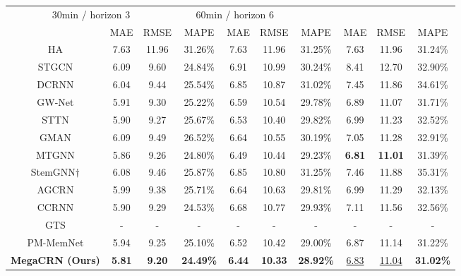 \documentclass[letterpaper]{article} \usepackage{aaai23}  \usepackage{times}  \usepackage{helvet}  \usepackage{courier}  \usepackage[hyphens]{url}  \usepackage{graphicx} \urlstyle{rm} \def\UrlFont{\rm}  \usepackage{natbib}  \usepackage{caption} \usepackage{multirow}
\begin{document}
\begin{table*}[h]
{\begin{tabular*}{17.6cm}{@{\extracolsep{\fill}}cccccccccc}
		\multicolumn{3}{c}{30min / horizon 3} &
		\multicolumn{3}{c}{60min / horizon 6} \\
		\cline{2-4} \cline{5-7} \cline{8-10}
		\multicolumn{1}{l}{} & 
		\multicolumn{1}{c}{MAE} & 
		\multicolumn{1}{c}{RMSE} &
		\multicolumn{1}{c}{MAPE} &
		\multicolumn{1}{c}{MAE} & 
		\multicolumn{1}{c}{RMSE} &
		\multicolumn{1}{c}{MAPE} &
		\multicolumn{1}{c}{MAE} & 
		\multicolumn{1}{c}{RMSE} &
		\multicolumn{1}{c}{MAPE} \\
		\hline
		HA\cite{li2018diffusion} & 7.63 & 11.96 & 31.26\% & 7.63 & 11.96 & 31.25\% & 7.63 & 11.96 & 31.24\% \\
		STGCN\cite{yu2018spatio} & 6.09 & 9.60 & 24.84\% & 6.91 & 10.99 & 30.24\% & 8.41 & 12.70 & 32.90\%\\
		DCRNN\cite{li2018diffusion} & 6.04 & 9.44 & 25.54\% & 6.85 & 10.87 & 31.02\% & 7.45 & 11.86 & 34.61\%\\
		GW-Net\cite{wu2019graph} & 5.91 & 9.30 & 25.22\% & 6.59 & 10.54 & 29.78\% & 6.89 & 11.07 & 31.71\% \\
		STTN\cite{xu2020spatial} & 5.90 & 9.27 & 25.67\% & 6.53 & 10.40 & 29.82\% & 6.99 & 11.23 & 32.52\%\\
		GMAN\cite{zheng2020gman} & 6.09 & 9.49 & 26.52\% & 6.64 & 10.55 & 30.19\% & 7.05 & 11.28 & 32.91\%\\
		MTGNN\cite{wu2020connecting} & 5.86 & 9.26 & 24.80\% & 6.49 & 10.44 & 29.23\% & \textbf{6.81} & \textbf{11.01} & 31.39\% \\
		StemGNN\cite{cao2020spectral}$\dagger$ & 6.08 & 9.46 & 25.87\% & 6.85 & 10.80 & 31.25\% & 7.46 & 11.88 & 35.31\%\\
		AGCRN\cite{bai2020adaptive} & 5.99 & 9.38 & 25.71\% & 6.64 & 10.63 & 29.81\% & 6.99 & 11.29 & 32.13\% \\
		CCRNN\cite{ye2021coupled} & 5.90 & 9.29 & 24.53\% & 6.68 & 10.77 & 29.93\% & 7.11 & 11.56 & 32.56\%\\
GTS\cite{shang2021discrete} & - & - & - & - & - & - & - & - & - \\
		PM-MemNet\cite{lee2021learning} & 5.94 & 9.25 & 25.10\% & 6.52 & 10.42 & 29.00\% & 6.87 & 11.14 & 31.22\% \\
\textbf{MegaCRN (Ours)} & \textbf{5.81} & \textbf{9.20} & \textbf{24.49\%} & \textbf{6.44} & \textbf{10.33} & \textbf{28.92\%} & \underline{6.83} & \underline{11.04} & \textbf{31.02\%} \\
		\hline
	\end{tabular*}
	}
	\centering
\end{table*}
\end{document}
